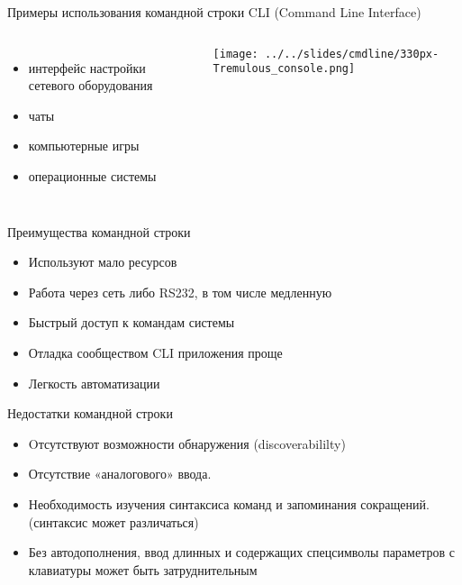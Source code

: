 
\begin{frame}{Примеры использования командной строки}
        CLI (Command Line Interface)
        \pause
	\begin{columns}
        \begin{itemize}
            \item интерфейс настройки сетевого оборудования
            \item чаты
            \item компьютерные игры
            \item операционные системы
        \end{itemize}
    \texttt{[image: ../../slides/cmdline/330px-Tremulous\_console.png]}
	\end{columns}
\end{frame}

\begin{frame}{Преимущества командной строки}
	\begin{itemize}
                \item Используют мало ресурсов
		\item Работа через сеть либо RS232, в том числе медленную
		\item Быстрый доступ к командам системы
		\item Отладка сообществом CLI приложения проще
		\item Легкость автоматизации
	\end{itemize}
\end{frame}

\begin{frame}{Недостатки командной строки}
	\begin{itemize}
		\item Oтсутствуют возможности обнаружения (discoverabililty)
		\item Отсутствие «аналогового» ввода.
		\item Необходимость изучения синтаксиса команд и запоминания сокращений.  (синтаксис может различаться)
		\item Без автодополнения, ввод длинных и содержащих спецсимволы параметров с клавиатуры может быть затруднительным
	\end{itemize}
\end{frame}

